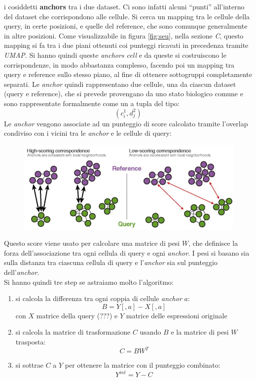 \documentclass[a4paper,12pt, oneside]{book}
\begin{document}
i cosiddetti \textbf{anchors} tra i due dataset. Ci sono infatti alcuni
``punti'' all'interno del dataset che corrispondono alle cellule. Si cerca un
mapping tra le cellule della query, in certe posizioni, e quelle del reference,
che sono comunque generalmente in altre posizioni. Come visualizzabile in figura
\ref{fig:seu}, nella sezione \textit{C}, questo mapping si fa tra i due piani
ottenuti coi punteggi ricavati in precedenza tramite \textit{UMAP}. Si hanno
quindi queste \textit{anchors cell} e da queste si costruiscono le
corrispondenze, in modo abbastanza complesso, facendo poi un mapping tra query e
reference sullo stesso piano, al fine di ottenere sottogruppi completamente
separati. Le \textit{anchor} quindi rappresentano due cellule, una da ciascun
dataset (query e reference), che si prevede provengano da uno stato biologico
comune e sono rappresentate formalmente come un a tupla del tipo:
\[(c_i^1, d_j^2)\]
Le \textit{anchor} vengono associate ad un punteggio di score calcolato tramite
l'overlap condiviso con i vicini tra le \textit{anchor} e le cellule di query:
\begin{figure}[H]
  \centering
  \includegraphics[scale = 0.35]{img/seu2.jpg}
\end{figure}
Questo score viene usato per calcolare una matrice di pesi $W$, che definisce la
forza dell'associazione tra ogni cellula di query e ogni \textit{anchor}. I pesi
si basano sia sulla distanza tra ciascuna cellula di query e l'\textit{anchor}
sia sul punteggio dell'\textit{anchor}.\\
Si hanno quindi tre step se astraiamo molto l'algoritmo:
\begin{enumerate}
  \item si calcola la differenza tra ogni coppia di cellule \textit{anchor} $a$:
  \[B=Y[,a]-X[,a]\]
  con $X$ matrice della query (???) e $Y$ matrice delle espressioni originale
  \item si calcola la matrice di trasformazione $C$ usando $B$ e la matrice di
  pesi $W$ trasposta:
  \[C=BW^T\]
  \item si sottrae $C$ a $Y$ per ottenere la matrice con il punteggio combinato:
  \[Y^{int}=Y-C\]
\end{enumerate}
\end{document}
